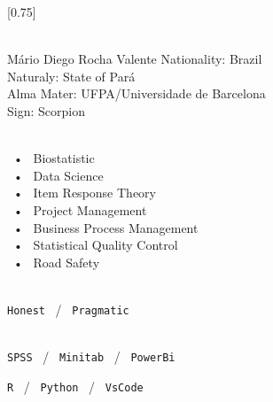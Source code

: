 \documentclass[lighthipster]{simplehipstercv}
\begin{document}
\setlength{\columnsep}{1.5cm}
[0.75]
\begin{paracol}{2}

\paracolbackgroundoptions



\footnotesize
{\setasidefontcolour
\flushright
\begin{center}
\end{center}



{\footnotesize }
\bigskip

 \\[0.5em]
Mário Diego Rocha Valente
Nationality: Brazil \\
Naturaly: State of Pará \\
Alma Mater: UFPA/Universidade de Barcelona \\
Sign: Scorpion

\bigskip

 \\[0.5em]


~•~ Biostatistic \\
~•~ Data Science \\
~•~ Item Response Theory \\
~•~ Project Management \\
~•~ Business Process Management \\
~•~ Statistical Quality Control \\
~•~ Road Safety \\



\bigskip

\\[0.5em]

\texttt{Honest} ~/~ \texttt{Pragmatic}  


\bigskip

\\[0.5em]

\texttt{SPSS} ~/~ \texttt{Minitab} ~/~ \texttt{PowerBi}

\texttt{R} ~/~ \texttt{Python} ~/~ \texttt{VsCode}

}
\end{paracol}
\end{document}
